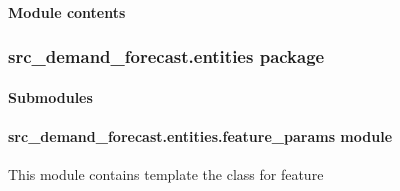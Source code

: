 \documentclass[letterpaper,10pt,english]{sphinxmanual}
\begin{document}
\paragraph{Module contents}
\label{\detokenize{src_demand_forecast.download:module-src_demand_forecast.download}}\label{\detokenize{src_demand_forecast.download:module-contents}}
\sphinxstepscope


\subsubsection{src\_demand\_forecast.entities package}
\label{\detokenize{src_demand_forecast.entities:src-demand-forecast-entities-package}}\label{\detokenize{src_demand_forecast.entities::doc}}

\paragraph{Submodules}
\label{\detokenize{src_demand_forecast.entities:submodules}}

\paragraph{src\_demand\_forecast.entities.feature\_params module}
\label{\detokenize{src_demand_forecast.entities:module-src_demand_forecast.entities.feature_params}}\label{\detokenize{src_demand_forecast.entities:src-demand-forecast-entities-feature-params-module}}
\sphinxAtStartPar
This module contains template the class for feature
\end{document}
